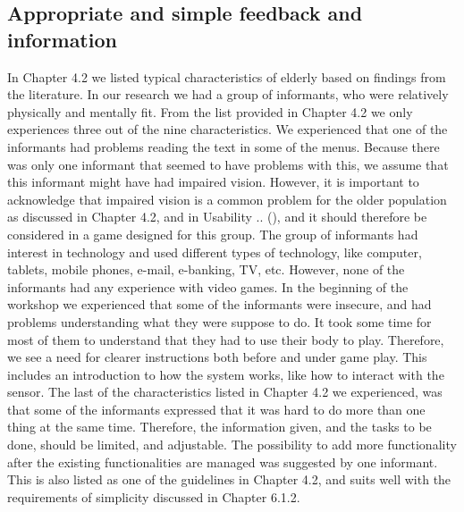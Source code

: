 \subsection{Appropriate and simple feedback and information}
In Chapter 4.2 we listed typical characteristics of elderly based on findings from the literature. In our research we had a group of informants, who were relatively physically and mentally fit. From the list provided in Chapter 4.2 we only experiences three out of the nine characteristics. We experienced that one of the informants had problems reading the text in some of the menus. Because there was only one informant that seemed to have problems with this, we assume that this informant might have had impaired vision. However, it is important to acknowledge that impaired vision is a common problem for the older population as discussed in Chapter 4.2, and in Usability .. (\cite{ijsselsteijn2007digital}), and it should therefore be considered in a game designed for this group. The group of informants had interest in technology and used different types of technology, like computer, tablets, mobile phones, e-mail, e-banking, TV, etc. However, none of the informants had any experience with video games. In the beginning of the workshop we experienced that some of the informants were insecure, and had problems understanding what they were suppose to do. It took some time for most of them to understand that they had to use their body to play. Therefore, we see a need for clearer instructions both before and under game play. This includes an introduction to how the system works, like how to interact with the sensor. The last of the characteristics listed in Chapter 4.2  we experienced, was that some of the informants expressed that it was hard to do more than one thing at the same time. Therefore, the information given, and the tasks to be done, should be limited, and adjustable. The possibility to add more functionality after the existing functionalities are managed was suggested by one informant. This is also listed as one of the guidelines in Chapter 4.2, and suits well with the requirements of simplicity discussed in Chapter 6.1.2. 

